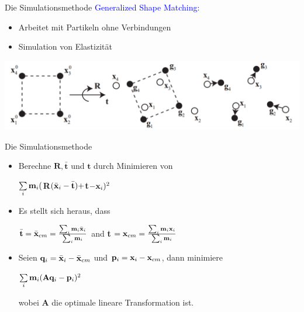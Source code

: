 \documentclass[t]{beamer}
\begin{document}
	\begin{frame}{Die Simulationsmethode}
		\textcolor{blue}{Generalized Shape Matching:}
		\begin{itemize}
			\item Arbeitet mit Partikeln ohne Verbindungen
			\item Simulation von Elastizität
		\end{itemize}
		\begin{center}
			\includegraphics[scale = 0.25]{ShapeMatching.png}
		\end{center}
		
	\end{frame}

	\begin{frame}{Die Simulationsmethode}
		\begin{itemize}
			\item Berechne $\mathbf{R}, \mathbf{\bar{t}}$ und $ \mathbf{t}$ durch Minimieren von \\
					\begin{center}
						$\sum\limits_{\mathnormal{i}}\mathnormal{\mathbf{m}_i}($\textbf{R}$(\mathnormal{\mathbf{\bar{x}}_i}-\mathnormal{\mathbf{\bar{t}}})+$\textbf{t}$-\mathnormal{\mathbf{x}_i})^2$
					\end{center}
			\item Es stellt sich heraus, dass \\
					\begin{center}
						$\mathnormal{\mathbf{\bar{t}}}=\mathnormal{\mathbf{\bar{x}}_{cm}}=\frac{\sum_{\mathnormal{i}}\mathnormal{\mathbf{m}_i} \mathnormal{\mathbf{\bar{x}}_i}}{\sum_{\mathnormal{i}}\mathnormal{\mathbf{m}_i}}$ and \textbf{t} $=\mathnormal{\mathbf{x}_{cm}}=\frac{\sum_{\mathnormal{i}}\mathnormal{\mathbf{m}_i \mathbf{x}_i}}{\sum_{\mathnormal{i}}\mathnormal{\mathbf{m}_i}}$
					\end{center}
			\item Seien $\mathnormal{\mathbf{q}_i}=\mathnormal{\mathbf{\bar{x}}_i}-\mathnormal{\mathbf{\bar{x}}_{cm}}$ und
					$\mathnormal{\mathbf{p}_i}=\mathnormal{\mathbf{x}_i}-\mathnormal{\mathbf{x}_{cm}}$, dann minimiere \\
					\begin{center}
						$\sum\limits_{\mathnormal{i}}\mathnormal{\mathbf{m}_i}(\mathnormal{\mathbf{A}\mathbf{q}_i}-\mathnormal{\mathbf{p}_i})^2$
					\end{center}
					wobei \textbf{A} die optimale lineare Transformation ist.	
								
		\end{itemize}
	\end{frame}
\end{document}
